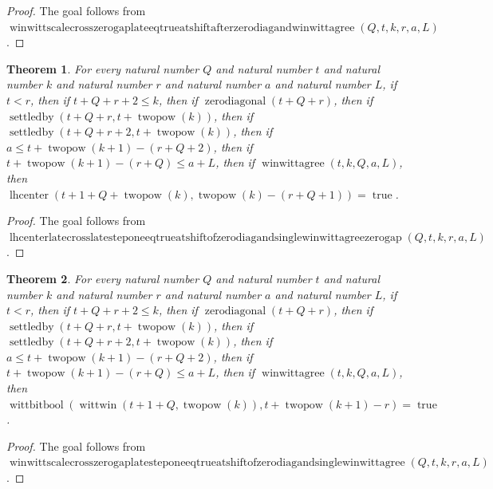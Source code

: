 \documentclass[11pt]{article}
\newtheorem{theorem}{Theorem}[section]
\theoremstyle{definition}
\begin{document}
\begin{proof}
The goal follows from \(\operatorname{winwittscalecrosszerogaplateeqtrueatshiftafterzerodiagandwinwittagree}(Q, t, k, r, a, L)\).
\end{proof}
\begin{theorem}
\label{ll:paper:lhcenter-late-cross-late-step-one-eq-true-at-shift-of-zero-diag-and-single-winwittagree-zero-gap}
For every natural number \(Q\) and natural number \(t\) and natural number \(k\) and natural number \(r\) and natural number \(a\) and natural number \(L\), if \(t < r\), then if \(t + Q + r + 2 \le k\), then if \(\operatorname{zerodiagonal}(t + Q + r)\), then if \(\operatorname{settledby}(t + Q + r, t + \operatorname{twopow}(k))\), then if \(\operatorname{settledby}(t + Q + r + 2, t + \operatorname{twopow}(k))\), then if \(a \le t + \operatorname{twopow}(k + 1) - (r + Q + 2)\), then if \(t + \operatorname{twopow}(k + 1) - (r + Q) \le a + L\), then if \(\operatorname{winwittagree}(t, k, Q, a, L)\), then \(\operatorname{lhcenter}(t + 1 + Q + \operatorname{twopow}(k), \operatorname{twopow}(k) - (r + Q + 1)) = \operatorname{true}\).
\end{theorem}
\begin{proof}
The goal follows from \(\operatorname{lhcenterlatecrosslatesteponeeqtrueatshiftofzerodiagandsinglewinwittagreezerogap}(Q, t, k, r, a, L)\).
\end{proof}
\begin{theorem}
\label{ll:paper:winwitt-scale-cross-zero-gap-late-step-one-eq-true-at-shift-of-zero-diag-and-single-winwittagree}
For every natural number \(Q\) and natural number \(t\) and natural number \(k\) and natural number \(r\) and natural number \(a\) and natural number \(L\), if \(t < r\), then if \(t + Q + r + 2 \le k\), then if \(\operatorname{zerodiagonal}(t + Q + r)\), then if \(\operatorname{settledby}(t + Q + r, t + \operatorname{twopow}(k))\), then if \(\operatorname{settledby}(t + Q + r + 2, t + \operatorname{twopow}(k))\), then if \(a \le t + \operatorname{twopow}(k + 1) - (r + Q + 2)\), then if \(t + \operatorname{twopow}(k + 1) - (r + Q) \le a + L\), then if \(\operatorname{winwittagree}(t, k, Q, a, L)\), then \(\operatorname{wittbitbool}(\operatorname{wittwin}(t + 1 + Q, \operatorname{twopow}(k)), t + \operatorname{twopow}(k + 1) - r) = \operatorname{true}\).
\end{theorem}
\begin{proof}
The goal follows from \(\operatorname{winwittscalecrosszerogaplatesteponeeqtrueatshiftofzerodiagandsinglewinwittagree}(Q, t, k, r, a, L)\).
\end{proof}
\end{document}
